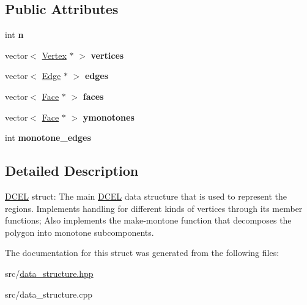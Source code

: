 \subsection*{Public Attributes}
\begin{DoxyCompactItemize}
\item 
\mbox{\label{structDCEL_ad95be5ea47a3e065ac3db8077ed8b11f}} 
int {\bfseries n}
\item 
\mbox{\label{structDCEL_ade0e662c344e8b99fd3276c1694439f3}} 
vector$<$ \hyperlink{structVertex}{Vertex} $\ast$ $>$ {\bfseries vertices}
\item 
\mbox{\label{structDCEL_a2c071fc3e862f820c53610c8618aa461}} 
vector$<$ \hyperlink{structEdge}{Edge} $\ast$ $>$ {\bfseries edges}
\item 
\mbox{\label{structDCEL_a2d7fd9417422b18f18e8c55f1d1f49e2}} 
vector$<$ \hyperlink{structFace}{Face} $\ast$ $>$ {\bfseries faces}
\item 
\mbox{\label{structDCEL_ad92c73a3c5980d727f9ec9f068bc2b0e}} 
vector$<$ \hyperlink{structFace}{Face} $\ast$ $>$ {\bfseries ymonotones}
\item 
\mbox{\label{structDCEL_aa88d0e054d12b2444fa45aa2da22d988}} 
int {\bfseries monotone\+\_\+edges}
\end{DoxyCompactItemize}


\subsection{Detailed Description}
\hyperlink{structDCEL}{D\+C\+EL} struct\+: The main \hyperlink{structDCEL}{D\+C\+EL} data structure that is used to represent the regions. Implements handling for different kinds of vertices through its member functions; Also implements the make-\/montone function that decomposes the polygon into monotone subcomponents. 

The documentation for this struct was generated from the following files\+:\begin{DoxyCompactItemize}
\item 
src/\hyperlink{data__structure_8hpp}{data\+\_\+structure.\+hpp}\item 
src/data\+\_\+structure.\+cpp\end{DoxyCompactItemize}
